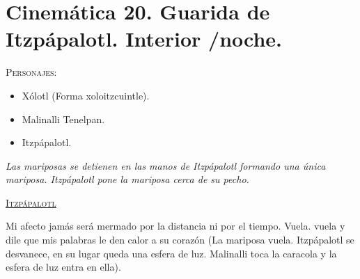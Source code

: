\section{Cinemática 20. Guarida de Itzpápalotl. Interior /noche.} \label{Cin:Cinematica20}
\textsc{Personajes}:
\begin{itemize}
\item Xólotl (Forma xoloitzcuintle).
\item Malinalli Tenelpan.
\item Itzpápalotl.
\end{itemize}
\textit{Las mariposas se detienen en las manos de Itzpápalotl formando una única mariposa. Itzpápalotl pone la mariposa cerca de su pecho.}
\begin{center}
\textsc{\underline{Itzpápalotl}}
\\
\par
Mi afecto jamás será mermado por la distancia ni por el tiempo. Vuela. vuela y dile que mis palabras le den calor a su corazón (La mariposa vuela. Itzpápalotl se desvanece, en su lugar queda una esfera de luz. Malinalli toca la caracola y la esfera de luz entra en ella).
\end{center}